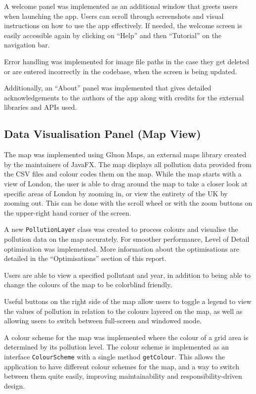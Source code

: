 \documentclass[10pt, a4paper]{scrartcl}
\begin{document}
\begin{multicols}{2}
\noindent A welcome panel was implemented as an additional window that greets users when launching the app. Users can
scroll through screenshots and visual instructions on how to use the app effectively. If needed, the welcome screen is
easily accessible again by clicking on “Help” and then “Tutorial” on the navigation bar.
    
\noindent Error handling was implemented for image file paths in the case they get deleted or are entered incorrectly
in the codebase, when the screen is being updated.
    
\noindent Additionally, an “About” panel was implemented that gives detailed acknowledgements to the authors of the
app along with credits for the external libraries and APIs used.
    
\subsection{Data Visualisation Panel (Map View)}

\noindent The map was implemented using Gluon Maps, an external maps library created by the maintainers of JavaFX.
The map displays all pollution data provided from the CSV files and colour codes them on the map. While the map starts
with a view of London, the user is able to drag around the map to take a closer look at specific areas of London by
zooming in, or view the entirety of the UK by zooming out. This can be done with the scroll wheel or with the zoom
buttons on the upper-right hand corner of the screen.
    
\noindent A new \verb|PollutionLayer| class was created to process colours and visualise the pollution data on the map accurately.
For smoother performance, Level of Detail optimisation was implemented. More information about the optimisations are
detailed in the “Optimisations” section of this report.
    
\noindent Users are able to view a specified pollutant and year, in addition to being able to change the
colours of the map to be colorblind friendly.
    
\noindent Useful buttons on the right side of the map allow users to toggle a legend to view the values of pollution
in relation to the colours layered on the map, as well as allowing users to switch between full-screen and windowed mode.
    
\noindent A colour scheme for the map was implemented where the colour of a grid area is determined by its pollution
level. The colour scheme is implemented as an interface \verb|ColourScheme| with a single method \verb|getColour|.
This allows the application to have different colour schemes for the map, and a way to switch between them quite easily,
improving maintainability and responsibility-driven design.


\end{multicols}
\end{document}
